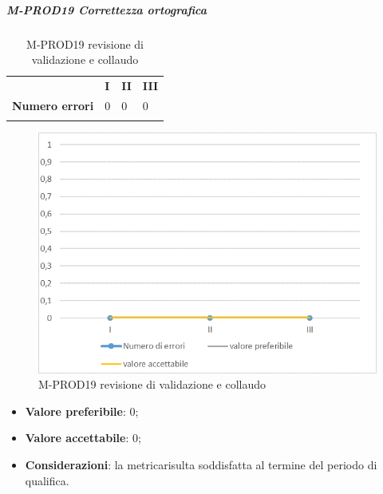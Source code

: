 \subparagraph{M-PROD19 Correttezza ortografica} \mbox{}
\begin{longtable}[H!] {						
		>{}p{50mm}  		
		>{}p{8mm}
		>{}p{8mm}		
		>{}p{8mm}		
	}
	\rowcolor{gray!50}
	\textbf{} & \textbf{I} & \textbf{II} & \textbf{III}  \TBstrut \\ [2mm]
	\textbf{Numero errori} & 0 & 0 & 0  \TBstrut \\ [2mm]
	\rowcolor{white}
	\caption{M-PROD19 revisione di validazione e collaudo}
\end{longtable}
\begin{figure}[H] 	
	\includegraphics[width=\linewidth]{./img/grafici/RA19.png}	
	\caption{M-PROD19 revisione di validazione e collaudo}	
\end{figure}
\begin{itemize}
	\item \textbf{Valore preferibile}: 0;
	\item \textbf{Valore accettabile}: 0;
	\item \textbf{Considerazioni}: la metrica\glosp risulta soddisfatta al termine del periodo di qualifica.
\end{itemize}


